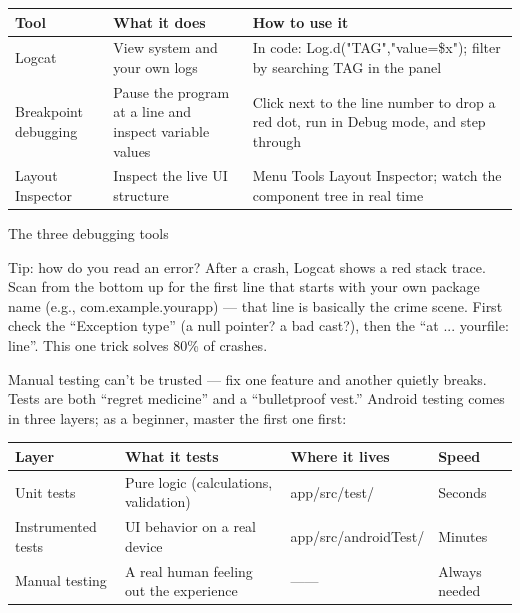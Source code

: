 


\begin{center}
\begin{tabularx}{\linewidth}{|X|X|X|}
\hline
\textbf{Tool} & \textbf{What it does} & \textbf{How to use it} \tabularnewline
\hline
Logcat & View system and your own logs & In code: Log.d("TAG","value=\$x"); filter by searching TAG in the panel \tabularnewline
Breakpoint debugging & Pause the program at a line and inspect variable values & Click next to the line number to drop a red dot, run in Debug mode, and step through \tabularnewline
Layout Inspector & Inspect the live UI structure & Menu Tools Layout Inspector; watch the component tree in real time \tabularnewline
\hline
\end{tabularx}
\end{center}

\begin{center}\small\color{gray}The three debugging tools\end{center}

\begin{tcbinfo}{Tip: how do you read an error?}
After a crash, Logcat shows a red stack trace. Scan from the bottom up for the first line that starts with your own package name (e.g., com.example.yourapp) — that line is basically the crime scene. First check the “Exception type” (a null pointer? a bad cast?), then the “at ... yourfile: line”. This one trick solves 80\% of crashes.

\end{tcbinfo}


Manual testing can't be trusted — fix one feature and another quietly breaks. Tests are both “regret medicine” and a “bulletproof vest.” Android testing comes in three layers; as a beginner, master the first one first:

\begin{center}
\begin{tabularx}{\linewidth}{|X|X|X|X|}
\hline
\textbf{Layer} & \textbf{What it tests} & \textbf{Where it lives} & \textbf{Speed} \tabularnewline
\hline
Unit tests & Pure logic (calculations, validation) & app/src/test/ & Seconds \tabularnewline
Instrumented tests & UI behavior on a real device & app/src/androidTest/ & Minutes \tabularnewline
Manual testing & A real human feeling out the experience & —— & Always needed \tabularnewline
\hline
\end{tabularx}
\end{center}


